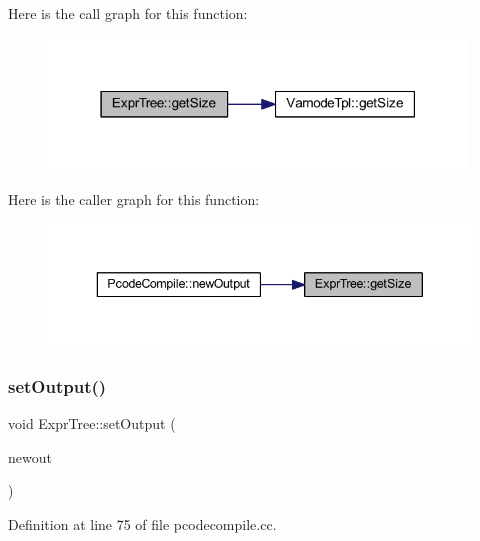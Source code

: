 Here is the call graph for this function\+:
\nopagebreak
\begin{figure}[H]
\begin{center}
\leavevmode
\includegraphics[width=315pt]{class_expr_tree_a485a318132f134d7f0d4793030dc28c9_cgraph}
\end{center}
\end{figure}
Here is the caller graph for this function\+:
\nopagebreak
\begin{figure}[H]
\begin{center}
\leavevmode
\includegraphics[width=343pt]{class_expr_tree_a485a318132f134d7f0d4793030dc28c9_icgraph}
\end{center}
\end{figure}
\mbox{\label{class_expr_tree_ab8cca7f394b661cc77a309057192fddc}} 
\subsubsection{\texorpdfstring{setOutput()}{setOutput()}}
{\footnotesize\ttfamily void Expr\+Tree\+::set\+Output (\begin{DoxyParamCaption}\item[{\mbox{\hyperlink{class_varnode_tpl}{Varnode\+Tpl}} $\ast$}]{newout }\end{DoxyParamCaption})}



Definition at line 75 of file pcodecompile.\+cc.

